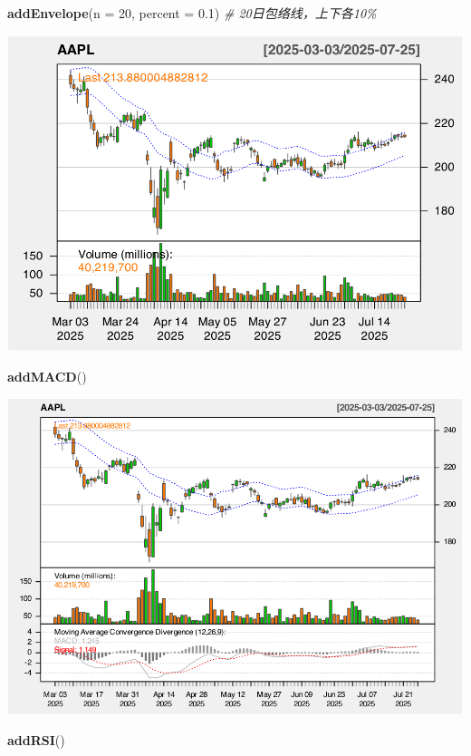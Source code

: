 \documentclass[]{ctexbook}
\newenvironment{Shaded}{\begin{snugshade}}{\end{snugshade}}
\newcommand{\AttributeTok}[1]{\textcolor[rgb]{0.13,0.29,0.53}{#1}}
\newcommand{\CommentTok}[1]{\textcolor[rgb]{0.56,0.35,0.01}{\textit{#1}}}
\newcommand{\DecValTok}[1]{\textcolor[rgb]{0.00,0.00,0.81}{#1}}
\newcommand{\FloatTok}[1]{\textcolor[rgb]{0.00,0.00,0.81}{#1}}
\newcommand{\FunctionTok}[1]{\textcolor[rgb]{0.13,0.29,0.53}{\textbf{#1}}}
\newcommand{\NormalTok}[1]{#1}
\begin{document}
\begin{Shaded}
\begin{Highlighting}[]
\FunctionTok{addEnvelope}\NormalTok{(}\AttributeTok{n =} \DecValTok{20}\NormalTok{, }\AttributeTok{percent =} \FloatTok{0.1}\NormalTok{)  }\CommentTok{\# 20日包络线，上下各10\%}
\end{Highlighting}
\end{Shaded}

\includegraphics[width=0.9\linewidth]{QuantmodHandbook_files/figure-latex/envol_2-2}

\begin{Shaded}
\begin{Highlighting}[]
\FunctionTok{addMACD}\NormalTok{()}
\end{Highlighting}
\end{Shaded}

\includegraphics[width=0.9\linewidth]{QuantmodHandbook_files/figure-latex/envol_2-3}

\begin{Shaded}
\begin{Highlighting}[]
\FunctionTok{addRSI}\NormalTok{()}
\end{Highlighting}
\end{Shaded}
\end{document}
